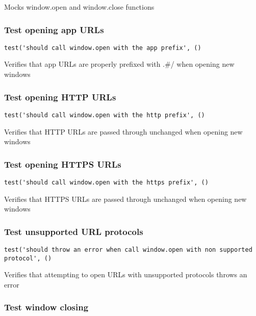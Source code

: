 \documentclass[a4paper]{article}
\begin{document}
Mocks window.open and window.close functions

\hypertarget{toc287}{}
\subsubsection{Test opening app URLs}

\begin{lstlisting}
test('should call window.open with the app prefix', ()
\end{lstlisting}

Verifies that app URLs are properly prefixed with .\#/
when opening new windows

\hypertarget{toc288}{}
\subsubsection{Test opening HTTP URLs}

\begin{lstlisting}
test('should call window.open with the http prefix', ()
\end{lstlisting}

Verifies that HTTP URLs are passed through unchanged
when opening new windows

\hypertarget{toc289}{}
\subsubsection{Test opening HTTPS URLs}

\begin{lstlisting}
test('should call window.open with the https prefix', ()
\end{lstlisting}

Verifies that HTTPS URLs are passed through unchanged
when opening new windows

\hypertarget{toc290}{}
\subsubsection{Test unsupported URL protocols}

\begin{lstlisting}
test('should throw an error when call window.open with non supported protocol', ()
\end{lstlisting}

Verifies that attempting to open URLs with unsupported protocols
throws an error

\hypertarget{toc291}{}
\subsubsection{Test window closing}
\end{document}
